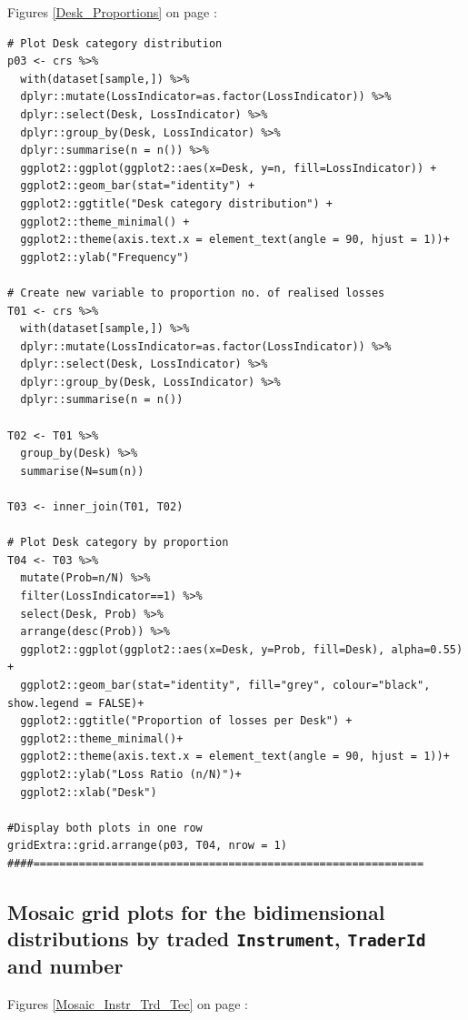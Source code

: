 \documentclass{DissertateUSU}
\begin{document}
Figures \ref{Desk_Proportions} on page \pageref{Desk_Proportions}:

\small

\begin{verbatim}
# Plot Desk category distribution
p03 <- crs %>%
  with(dataset[sample,]) %>%
  dplyr::mutate(LossIndicator=as.factor(LossIndicator)) %>%
  dplyr::select(Desk, LossIndicator) %>%
  dplyr::group_by(Desk, LossIndicator) %>%
  dplyr::summarise(n = n()) %>%
  ggplot2::ggplot(ggplot2::aes(x=Desk, y=n, fill=LossIndicator)) +
  ggplot2::geom_bar(stat="identity") +
  ggplot2::ggtitle("Desk category distribution") +
  ggplot2::theme_minimal() +
  ggplot2::theme(axis.text.x = element_text(angle = 90, hjust = 1))+
  ggplot2::ylab("Frequency")

# Create new variable to proportion no. of realised losses
T01 <- crs %>%
  with(dataset[sample,]) %>%
  dplyr::mutate(LossIndicator=as.factor(LossIndicator)) %>%
  dplyr::select(Desk, LossIndicator) %>%
  dplyr::group_by(Desk, LossIndicator) %>%
  dplyr::summarise(n = n())

T02 <- T01 %>%
  group_by(Desk) %>%
  summarise(N=sum(n))

T03 <- inner_join(T01, T02)

# Plot Desk category by proportion
T04 <- T03 %>%
  mutate(Prob=n/N) %>%
  filter(LossIndicator==1) %>%
  select(Desk, Prob) %>%
  arrange(desc(Prob)) %>%
  ggplot2::ggplot(ggplot2::aes(x=Desk, y=Prob, fill=Desk), alpha=0.55) +
  ggplot2::geom_bar(stat="identity", fill="grey", colour="black", show.legend = FALSE)+
  ggplot2::ggtitle("Proportion of losses per Desk") +
  ggplot2::theme_minimal()+
  ggplot2::theme(axis.text.x = element_text(angle = 90, hjust = 1))+
  ggplot2::ylab("Loss Ratio (n/N)")+
  ggplot2::xlab("Desk")

#Display both plots in one row
gridExtra::grid.arrange(p03, T04, nrow = 1)
####============================================================
\end{verbatim}

\normalsize

\subsection{Mosaic grid plots for the bidimensional distributions by traded \texttt{Instrument}, \texttt{TraderId} and number}
\label{ssec:Mosaic bidimensional grid plot}

Figures \ref{Mosaic_Instr_Trd_Tec} on page
\pageref{Mosaic_Instr_Trd_Tec}:
\end{document}
